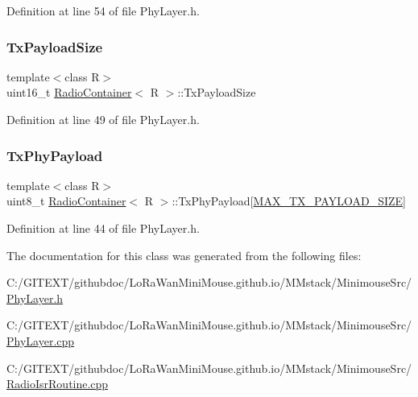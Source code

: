 Definition at line 54 of file Phy\+Layer.\+h.

\mbox{\label{class_radio_container_abb44acd5f52b34e0a1ffaa3a1dec0bbd}} 
\subsubsection{\texorpdfstring{Tx\+Payload\+Size}{TxPayloadSize}}
{\footnotesize\ttfamily template$<$class R$>$ \\
uint16\+\_\+t \mbox{\hyperlink{class_radio_container}{Radio\+Container}}$<$ R $>$\+::Tx\+Payload\+Size}



Definition at line 49 of file Phy\+Layer.\+h.

\mbox{\label{class_radio_container_ad91ae082ac2890e7b71546c4b7efb5ba}} 
\subsubsection{\texorpdfstring{Tx\+Phy\+Payload}{TxPhyPayload}}
{\footnotesize\ttfamily template$<$class R$>$ \\
uint8\+\_\+t \mbox{\hyperlink{class_radio_container}{Radio\+Container}}$<$ R $>$\+::Tx\+Phy\+Payload\mbox{[}\mbox{\hyperlink{_define_8h_ade046d6a940b0e4d9f3ae9415066ee6f}{M\+A\+X\+\_\+\+T\+X\+\_\+\+P\+A\+Y\+L\+O\+A\+D\+\_\+\+S\+I\+ZE}}\mbox{]}}



Definition at line 44 of file Phy\+Layer.\+h.



The documentation for this class was generated from the following files\+:\begin{DoxyCompactItemize}
\item 
C\+:/\+G\+I\+T\+E\+X\+T/githubdoc/\+Lo\+Ra\+Wan\+Mini\+Mouse.\+github.\+io/\+M\+Mstack/\+Minimouse\+Src/\mbox{\hyperlink{_phy_layer_8h}{Phy\+Layer.\+h}}\item 
C\+:/\+G\+I\+T\+E\+X\+T/githubdoc/\+Lo\+Ra\+Wan\+Mini\+Mouse.\+github.\+io/\+M\+Mstack/\+Minimouse\+Src/\mbox{\hyperlink{_phy_layer_8cpp}{Phy\+Layer.\+cpp}}\item 
C\+:/\+G\+I\+T\+E\+X\+T/githubdoc/\+Lo\+Ra\+Wan\+Mini\+Mouse.\+github.\+io/\+M\+Mstack/\+Minimouse\+Src/\mbox{\hyperlink{_radio_isr_routine_8cpp}{Radio\+Isr\+Routine.\+cpp}}\end{DoxyCompactItemize}
